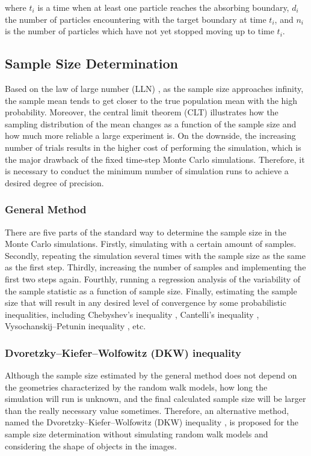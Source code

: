 where $t_i$ is a time when at least one particle reaches the absorbing
boundary, $d_i$ the number of particles encountering with the target
boundary at time $t_i$, and $n_i$ is the number of particles which
have not yet stopped moving up to time $t_i$.


\subsection{Sample Size Determination}

Based on the law of large number (LLN) \cite{dekking2005modern}, as
the sample size approaches infinity, the sample mean tends to get
closer to the true population mean with the high
probability. Moreover, the central limit theorem (CLT)
\cite{dekking2005modern} illustrates how the sampling distribution of
the mean changes as a function of the sample size and how much more
reliable a large experiment is. On the downside, the increasing number
of trials results in the higher cost of performing the simulation,
which is the major drawback of the fixed time-step Monte Carlo
simulations. Therefore, it is necessary to conduct the minimum number
of simulation runs to achieve a desired degree of precision.


\subsubsection{General Method}

There are five parts of the standard way to determine the sample size
in the Monte Carlo simulations. Firstly, simulating with a certain
amount of samples. Secondly, repeating the simulation several times
with the sample size as the same as the first step.  Thirdly,
increasing the number of samples and implementing the first two steps
again. Fourthly, running a regression analysis of the variability of
the sample statistic as a function of sample size. Finally, estimating
the sample size that will result in any desired level of convergence
by some probabilistic inequalities, including Chebyshev's inequality
\cite{chebyshev1867valeurs}, Cantelli’s inequality
\cite{cantelli1929sui}, Vysochanskij–Petunin inequality
\cite{vysochanskij1980justification}, etc.


\subsubsection{Dvoretzky–Kiefer–Wolfowitz (DKW) inequality}

Although the sample size estimated by the general method does not
depend on the geometries characterized by the random walk models, how
long the simulation will run is unknown, and the final calculated
sample size will be larger than the really necessary value
sometimes. Therefore, an alternative method, named the
Dvoretzky–Kiefer–Wolfowitz (DKW) inequality
\cite{dvoretzky1956asymptotic}, is proposed for the sample size
determination without simulating random walk models and considering
the shape of objects in the images.

